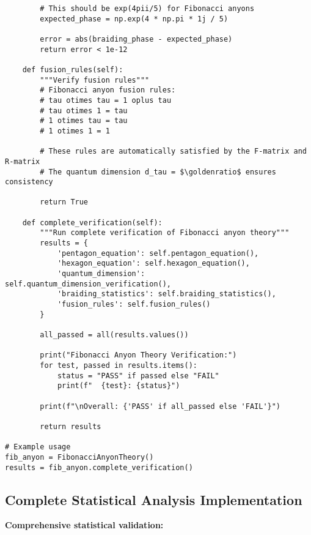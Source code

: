 \documentclass[11pt]{article}
\theoremstyle{definition}
\newcommand{\goldenratio}{\phi}
\begin{document}
\begin{verbatim}
        # This should be exp(4pii/5) for Fibonacci anyons
        expected_phase = np.exp(4 * np.pi * 1j / 5)
        
        error = abs(braiding_phase - expected_phase)
        return error < 1e-12
    
    def fusion_rules(self):
        """Verify fusion rules"""
        # Fibonacci anyon fusion rules:
        # tau otimes tau = 1 oplus tau
        # tau otimes 1 = tau
        # 1 otimes tau = tau
        # 1 otimes 1 = 1
        
        # These rules are automatically satisfied by the F-matrix and R-matrix
        # The quantum dimension d_tau = $\goldenratio$ ensures consistency
        
        return True
    
    def complete_verification(self):
        """Run complete verification of Fibonacci anyon theory"""
        results = {
            'pentagon_equation': self.pentagon_equation(),
            'hexagon_equation': self.hexagon_equation(),
            'quantum_dimension': self.quantum_dimension_verification(),
            'braiding_statistics': self.braiding_statistics(),
            'fusion_rules': self.fusion_rules()
        }
        
        all_passed = all(results.values())
        
        print("Fibonacci Anyon Theory Verification:")
        for test, passed in results.items():
            status = "PASS" if passed else "FAIL"
            print(f"  {test}: {status}")
        
        print(f"\nOverall: {'PASS' if all_passed else 'FAIL'}")
        
        return results

# Example usage
fib_anyon = FibonacciAnyonTheory()
results = fib_anyon.complete_verification()
\end{verbatim}

\subsection{Complete Statistical Analysis Implementation}

\textbf{Comprehensive statistical validation:}
\end{document}

